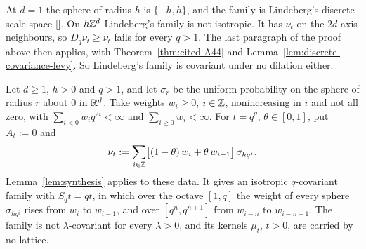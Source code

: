 At $d = 1$ the sphere of radius $h$ is $\{-h, h\}$, and the family is Lindeberg's discrete scale
space []. On $h\mathbb{Z}^d$ Lindeberg's family is not isotropic. It has
$\nu_t$ on the $2d$ axis neighbours, so $D_q\nu_t \ge \nu_t$ fails for every $q > 1$. The last
paragraph of the proof above then applies, with Theorem~\ref{thm:cited-A44} and
Lemma~\ref{lem:discrete-covariance-levy}. So Lindeberg's family is covariant under no dilation
either.

\begin{proposition}
\label{prop:stratum-two-example}

Let $d \ge 1$, $h > 0$ and $q > 1$, and let $\sigma_r$ be the uniform probability on the sphere of
radius $r$ about $0$ in $\mathbb{R}^d$. Take weights $w_i \ge 0$, $i \in \mathbb{Z}$, nonincreasing in $i$ and not
all zero, with $\sum_{i<0}w_iq^{2i} < \infty$ and $\sum_{i \ge 0}w_i < \infty$. For $t = q^\theta$, $\theta \in [0, 1]$, put
$A_t := 0$ and
\[
  \nu_t := \sum_{i \in \mathbb{Z}}\bigl[(1 - \theta)\,w_i + \theta\,w_{i-1}\bigr]\,\sigma_{hq^i}.
\]
Lemma~\ref{lem:synthesis} applies to these data. It gives an isotropic $q$-covariant family with
$S_qt = qt$, in which over the octave $[1, q]$ the weight of every sphere $\sigma_{hq^i}$ rises from
$w_i$ to $w_{i-1}$, and over $[q^n, q^{n+1}]$ from $w_{i-n}$ to $w_{i-n-1}$. The family is not
$\lambda$-covariant for every $\lambda > 0$, and its kernels $\mu_t$, $t > 0$, are carried by no
lattice.
\end{proposition}


